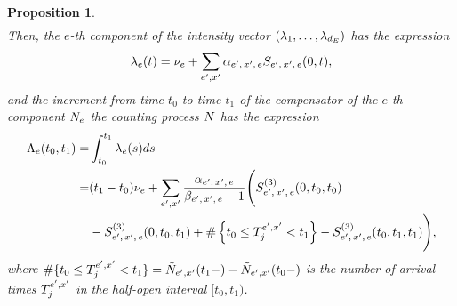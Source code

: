 \documentclass[10pt, article,table]{article}
\newtheorem{prop}[thm]{Proposition}
\begin{document}
\begin{prop}
\begin{equation}
\begin{split}
  \end{split}
 \end{equation}
 Then, the $e$-th component of the intensity vector $(\intensity[1],\dots,\intensity[\numEventTypes])$ has the expression
 \begin{equation}\label{eq.intensity_powerlaw}
  \intensity[e](t) = \baseRate_e +\sum_{\eone,\xone}\impCoef\subscriptexe\ESSE\subscriptexe(0,t),
 \end{equation}
and the increment from time $t_0$ to time $t_1$ of the compensator of the $e$-th component $\countingProc$ the counting process $\multiCountingProc$ has the expression
\begin{equation}
\begin{split}
 \compensator_e(t_0,t_1)=&\int_{t_0}^{t_1} \intensity[e](s)ds
 \\
 =&
 (t_1 - t_0)\baseRate_e
 + \sum_{\eone,\xone} \frac{\impCoef\subscriptexe}{\decCoef\subscriptexe - 1}
 \Bigg(
 \ESSEthree\subscriptexe(0,t_0,t_0) 
 \\
 & - \ESSEthree\subscriptexe(0,t_0,t_1)
 +\# \left\lbrace t_0 \leq \arrivalTimes[\eone,\xone]_j <t_1\right\rbrace
 - \ESSEthree\subscriptexe(t_0,t_1,t_1)
 \Bigg),
\end{split} 
\end{equation}
where $\# \lbrace t_0 \leq \arrivalTimes[\eone,\xone]_j <t_1\rbrace = \hybridHawkes_{\eone,\xone}(t_1 -)-\hybridHawkes_{\eone,\xone}(t_0-)$ is the number of arrival times $\arrivalTimes[\eone,\xone]_j$ in the half-open interval $[t_0,t_1)$. 
\end{prop}
\end{document}
